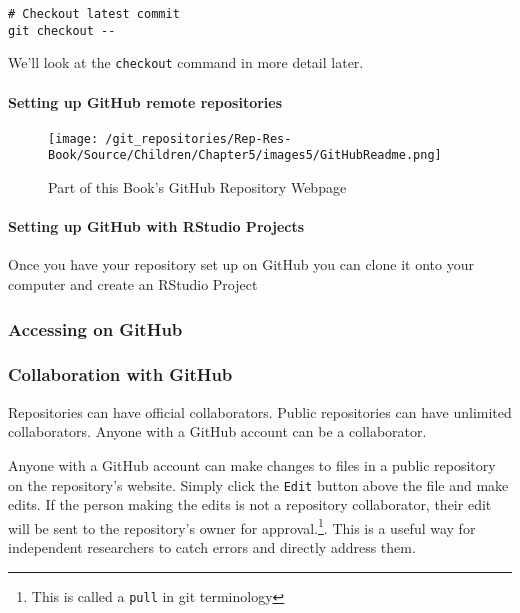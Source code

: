 \begin{knitrout}
\color{fgcolor}\begin{kframe}
\begin{verbatim}
# Checkout latest commit
git checkout --
\end{verbatim}
\end{kframe}
\end{knitrout}


\noindent We'll look at the \texttt{checkout} command in more detail later. 

\paragraph{Setting up GitHub remote repositories}

\begin{figure}[t]
    \caption{Part of this Book's GitHub Repository Webpage}
    \label{BookRepository}
    \begin{center}
    \texttt{[image: /git\_repositories/Rep-Res-Book/Source/Children/Chapter5/images5/GitHubReadme.png]}
    \end{center}
\end{figure}

\paragraph{Setting up GitHub with RStudio Projects}

Once you have your repository set up on GitHub you can clone it onto your computer and create an RStudio Project

\subsubsection{Accessing on GitHub}

\subsubsection{Collaboration with GitHub}

Repositories can have official collaborators. Public repositories can have unlimited collaborators. Anyone with a GitHub account can be a collaborator. 
 

Anyone with a GitHub account can make changes to files in a public repository on the repository's website. Simply click the \texttt{Edit} button above the file and make edits. If the person making the edits is not a repository collaborator, their edit will be sent to the repository's owner for approval.\footnote{This is called a \texttt{pull} in git terminology}. This is a useful way for independent researchers to catch errors and directly address them.

